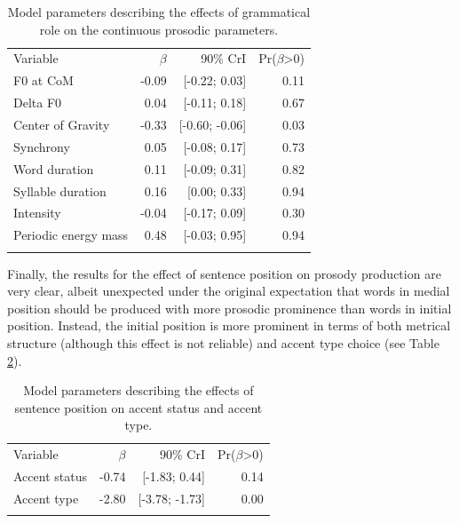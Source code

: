 \begin{table}[]
\begin{tabular}{lrrr}
\lsptoprule
\multicolumn{4}{c}{Grammatical role} \\ \hline
Variable    & $\beta$ & 90\% CrI  & Pr($\beta$\textgreater{}0) \\ \hline
F0 at CoM    & -0.09       & {[}-0.22; 0.03{]}  & 0.11                          \\
Delta F0    & 0.04       & {[}-0.11; 0.18{]}  & 0.67                          \\
Center of Gravity            & -0.33       & {[}-0.60; -0.06{]}  & 0.03                          \\
Synchrony            & 0.05       & {[}-0.08; 0.17{]}  & 0.73                          \\
Word duration            & 0.11       & {[}-0.09; 0.31{]}  & 0.82                          \\
Syllable duration & 0.16       & {[}0.00; 0.33{]}  & 0.94                             \\
Intensity             & -0.04       & {[}-0.17; 0.09{]} & 0.30                          \\
Periodic energy mass         & 0.48       & {[}-0.03; 0.95{]} & 0.94                          \\
\lspbottomrule
\end{tabular}
\caption{Model parameters describing the effects of grammatical role on the continuous prosodic parameters.}
\label{table:model_parameters_gramm_role}
\end{table}

Finally, the results for the effect of sentence position on prosody production are very clear, albeit unexpected under the original expectation that words in medial position should be produced with more prosodic prominence than words in initial position. Instead, the initial position is more prominent in terms of both metrical structure (although this effect is not reliable) and accent type choice (see Table \ref{table:model_parameterscat_position}).

\begin{table}[]
\begin{tabular}{lrrr}
\lsptoprule
\multicolumn{4}{c}{Sentence position} \\ \hline
Variable    & $\beta$ & 90\% CrI  & Pr($\beta$\textgreater{}0) \\ \hline
Accent status    & -0.74       & {[}-1.83; 0.44{]}  & 0.14                          \\
Accent type        & -2.80       & {[}-3.78; -1.73{]} & 0.00                          \\
\lspbottomrule
\end{tabular}
\caption{Model parameters describing the effects of sentence position on accent status and accent type.}
\label{table:model_parameterscat_position}
\end{table}

